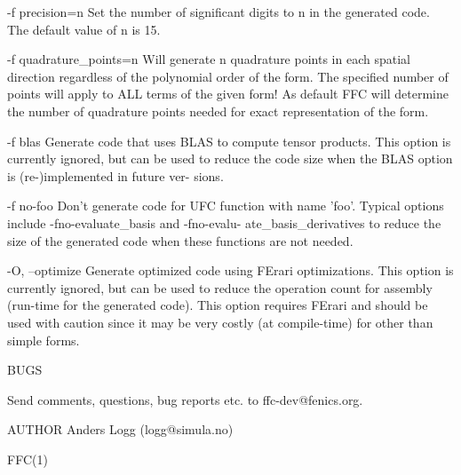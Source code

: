        -f precision=n
              Set the number of significant digits to n in the generated code.
              The default value of n is 15.

       -f quadrature_points=n
              Will  generate  n quadrature  points  in  each spatial direction
              regardless of the  polynomial order of the  form. The  specified
              number  of points  will apply to ALL terms of the given form! As
              default  FFC  will  determine  the  number of quadrature  points
              needed for exact representation of the form.

       -f blas
              Generate code that uses BLAS to compute tensor  products.   This
              option  is currently ignored, but can be used to reduce the code
              size when the BLAS option is  (re-)implemented  in  future  ver-
              sions.

       -f no-foo
              Don't  generate  code  for UFC function with name 'foo'. Typical
              options    include    -fno-evaluate_basis    and     -fno-evalu-
              ate_basis_derivatives  to  reduce the size of the generated code
              when these functions are not needed.

       -O, --optimize
              Generate optimized code using FErari optimizations. This  option
              is  currently  ignored,  but can be used to reduce the operation
              count for assembly  (run-time  for  the  generated  code).  This
              option  requires FErari and should be used with caution since it
              may be very costly  (at  compile-time)  for  other  than  simple
              forms.



       BUGS

       Send comments, questions, bug reports etc. to ffc-dev@fenics.org.


AUTHOR
       Anders Logg (logg@simula.no)



                                                                        FFC(1)
